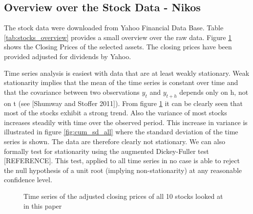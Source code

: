 \subsection{Overview over the Stock Data - Nikos}
The stock data were downloaded from Yahoo Financial Data Base. Table \ref{tab:stocks_overview} provides a small overview over the raw data. Figure \ref{fig:Daily Stock Prices for all Stocks in the Data Set} shows the Closing Prices of the selected assets. The closing prices have been provided adjusted for dividends by Yahoo. 

Time series analysis is easiest with data that are at least weakly stationary. Weak stationarity implies that the mean of the time series is constant over time and that the covariance between two observations $y_t$ and $y_{t+h}$ depends only on h, not on t (see [Shumway and Stoffer 2011]). From figure \ref{fig:Daily Stock Prices for all Stocks in the Data Set} it can be clearly seen that most of the stocks exhibit a strong trend. Also the variance of most stocks increases steadily with time over the observed period. This increase in variance is illustrated in figure \ref{fig:cum_sd_all} where the standard deviation of the time series is shown. The data are therefore clearly not stationary. We can also formally test for stationarity using the augmented Dickey-Fuller test [REFERENCE]. This test, applied to all time series in no case is able to reject the null hypothesis of a unit root (implying non-stationarity) at any reasonable confidence level. 


\begin{table}[]
    \centering
    \begin{adjustbox}{width = 0.9\linewidth}
    \setlength{\tabcolsep}{15pt}
    
    \end{adjustbox}
    \caption{}
    \label{tab:stocks_overview}
\end{table}{}

\begin{figure}[h]
    \centering
    \begin{adjustbox}{width=.9\textwidth,center}
    
    \end{adjustbox}  
    \caption{Time series of the adjusted closing prices of all 10 stocks looked at in this paper}
    \label{fig:Daily Stock Prices for all Stocks in the Data Set}
\end{figure}{}

